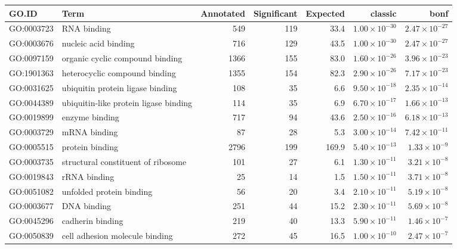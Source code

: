 \begin{table}[ht]
\centering
\begin{adjustbox}{width=\textwidth}

\begin{tabular}{llrrrrr}
  \hline
GO.ID & Term & Annotated & Significant & Expected & classic & bonf \\ 
  \hline
GO:0003723 & RNA binding & 549 & 119 & 33.4 & $1.00 \times 10^{-30}$ & $2.47 \times 10^{-27}$ \\ 
  GO:0003676 & nucleic acid binding & 716 & 129 & 43.5 & $1.00 \times 10^{-30}$ & $2.47 \times 10^{-27}$ \\ 
  GO:0097159 & organic cyclic compound binding & 1366 & 155 & 83.0 & $1.60 \times 10^{-26}$ & $3.96 \times 10^{-23}$ \\ 
  GO:1901363 & heterocyclic compound binding & 1355 & 154 & 82.3 & $2.90 \times 10^{-26}$ & $7.17 \times 10^{-23}$ \\ 
  GO:0031625 & ubiquitin protein ligase binding & 108 & 35 & 6.6 & $9.50 \times 10^{-18}$ & $2.35 \times 10^{-14}$ \\ 
  GO:0044389 & ubiquitin-like protein ligase binding & 114 & 35 & 6.9 & $6.70 \times 10^{-17}$ & $1.66 \times 10^{-13}$ \\ 
  GO:0019899 & enzyme binding & 717 & 94 & 43.6 & $2.50 \times 10^{-16}$ & $6.18 \times 10^{-13}$ \\ 
  GO:0003729 & mRNA binding & 87 & 28 & 5.3 & $3.00 \times 10^{-14}$ & $7.42 \times 10^{-11}$ \\ 
  GO:0005515 & protein binding & 2796 & 199 & 169.9 & $5.40 \times 10^{-13}$ & $1.33 \times 10^{-9}$ \\ 
  GO:0003735 & structural constituent of ribosome & 101 & 27 & 6.1 & $1.30 \times 10^{-11}$ & $3.21 \times 10^{-8}$ \\ 
  GO:0019843 & rRNA binding & 25 & 14 & 1.5 & $1.50 \times 10^{-11}$ & $3.71 \times 10^{-8}$ \\ 
  GO:0051082 & unfolded protein binding & 56 & 20 & 3.4 & $2.10 \times 10^{-11}$ & $5.19 \times 10^{-8}$ \\ 
  GO:0003677 & DNA binding & 251 & 44 & 15.2 & $2.30 \times 10^{-11}$ & $5.69 \times 10^{-8}$ \\ 
  GO:0045296 & cadherin binding & 219 & 40 & 13.3 & $5.90 \times 10^{-11}$ & $1.46 \times 10^{-7}$ \\ 
  GO:0050839 & cell adhesion molecule binding & 272 & 45 & 16.5 & $1.00 \times 10^{-10}$ & $2.47 \times 10^{-7}$ \\ 

\end{tabular}
\end{adjustbox}
\end{table}
